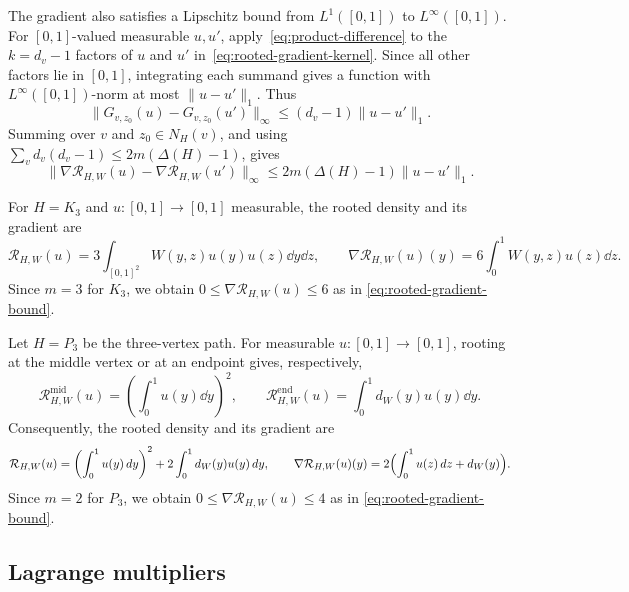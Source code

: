 The gradient also satisfies a Lipschitz bound from $L^1([0,1])$ to $L^\infty([0,1])$.
For $[0,1]$-valued measurable $u,u'$, apply~\eqref{eq:product-difference}
to the $k=d_v-1$ factors of $u$ and $u'$ in~\eqref{eq:rooted-gradient-kernel}.
Since all other factors lie in $[0,1]$, integrating each summand gives
a function with $L^\infty([0,1])$-norm at most $\|u-u'\|_1$.  Thus
\[
  \|G_{v,z_0}(u)-G_{v,z_0}(u')\|_\infty
  \le(d_v-1)\|u-u'\|_1.
\]
Summing over $v$ and $z_0\in N_H(v)$, and using
$\sum_v d_v(d_v-1)\le2m(\Delta(H)-1)$, gives
\begin{equation}\label{eq:gradient-lipschitz}
  \|\nabla\mathcal R_{H,W}(u)-\nabla\mathcal R_{H,W}(u')\|_\infty
  \le2m(\Delta(H)-1)\|u-u'\|_1.
\end{equation}

\begin{expl}\label{expl:triangle-rooted}
For $H=K_3$ and $u : [0,1]\to[0,1]$ measurable, the rooted density and its gradient are
\[
  \mathcal R_{H,W}(u)=3\int_{[0,1]^2}W(y,z)u(y)u(z)\dd y\dd z,
  \qquad
  \nabla\mathcal R_{H,W}(u)(y)=6\int_0^1W(y,z)u(z)\dd z.
\]
Since $m=3$ for $K_3$, we obtain $0\le\nabla\mathcal R_{H,W}(u)\le6$
as in \eqref{eq:rooted-gradient-bound}.
\end{expl}

\begin{expl}\label{expl:path-rooted}
Let $H=P_3$ be the three-vertex path.
For measurable $u:[0,1]\to[0,1]$, rooting at the middle vertex or at
an endpoint gives, respectively,
\[
  \mathcal R_{H,W}^{\text{mid}}(u)=\left(\int_0^1u(y)\dd y\right)^2,
  \qquad
  \mathcal R_{H,W}^{\text{end}}(u)=\int_0^1d_W(y)u(y)\dd y.
\]
Consequently, the rooted density and its gradient are
\[
  \mathcal R_{H,W}(u)
  =\left(\int_0^1u(y)\,d y\right)^2
    +2\int_0^1d_W(y)u(y)\,d y,
  \qquad
  \nabla\mathcal R_{H,W}(u)(y)
  =2\Bigl(\int_0^1u(z)\,d z+d_W(y)\Bigr).
\]
Since $m=2$ for $P_3$, we obtain $0\le\nabla\mathcal R_{H,W}(u)\le4$
as in \eqref{eq:rooted-gradient-bound}.
\end{expl}

\subsection{Lagrange multipliers}\label{sec:lagrange-multipliers}

